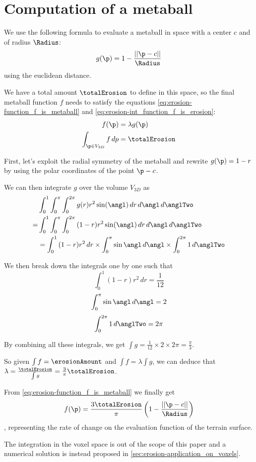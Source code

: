 \chapter{Computation of a metaball}
\label{sec:erosion-appendix_metaball}


We use the following formula to evaluate a metaball in space with a center $c$ and of radius $\Radius$:
$$ g(\p) = 1 - \frac{||\p - c||}{\Radius} $$
using the euclidean distance.

We have a total amount $\totalErosion$ to define in this space, so the final metaball function $f$ needs to satisfy the equations \eqref{eq:erosion-function_f_is_metaball} and \eqref{eq:erosion-int_function_f_is_erosion}:
\begin{align}
\label{eq:erosion-function_f_is_metaball}
f(\p) &= \lambda g(\p) \\
\label{eq:erosion-int_function_f_is_erosion}
\int_{\p \in V_{3D}}{f \, dp} &= \totalErosion
\end{align}

First, let's exploit the radial symmetry of the metaball and rewrite $g(\p) = 1 - r$ by using the polar coordinates of the point $\p - c$.

We can then integrate $g$ over the volume $V_{3D}$ as 
\begin{align}
&\int_{0}^{1}{ \int_{0}^{\pi}{ \int_{0}^{2\pi}{ g(r) r^2 \sin(\angl)\, dr} \, d\angl} \, d\anglTwo} \nonumber \\
= &\int_{0}^{1}{ \int_{0}^{\pi}{ \int_{0}^{2\pi}{ (1 - r) r^2 \sin(\angl)\, dr} \, d\angl} \, d\anglTwo} \nonumber \\
&= \int_{0}^{1}{ (1 - r)r^2 \, dr} \times \int_{0}^{\pi}{ \sin{\angl} \, d\angl } \times \int_{0}^{2\pi}{ 1 \, d\anglTwo} \nonumber
\end{align}

We then break down the integrals one by one such that 
$$ \int_{0}^{1}{ (1 - r)r^2 \, dr} = \frac{1}{12} \nonumber$$ 
$$ \int_{0}^{\pi}{ \sin{\angl} \, d\angl } = 2 \nonumber$$ 
$$ \int_{0}^{2\pi}{ 1 \, d\anglTwo} = 2 \pi \nonumber$$

By combining all these integrals, we get $\int{g} = \frac{1}{12} \times 2 \times 2\pi = \frac{\pi}{3}$.

So given $\int{f} = \erosionAmount$ and $\int{f} = \lambda \int{g}$, we can deduce that $\lambda = \frac{\totalErosion}{\int{g}} = \frac{3}{\pi}\totalErosion$.

From \eqref{eq:erosion-function_f_is_metaball} we finally get 
\begin{align} 
\label{eq:erosion-proofErosionMetaball}
f(\p) = \frac{3 \totalErosion}{\pi} \left(1 - \frac{||\p - c||}{\Radius} \right)
\end{align}
, representing the rate of change on the evaluation function of the terrain surface.

The integration in the voxel space is out of the scope of this paper and a numerical solution is instead proposed in \cref{sec:erosion-application_on_voxels}.